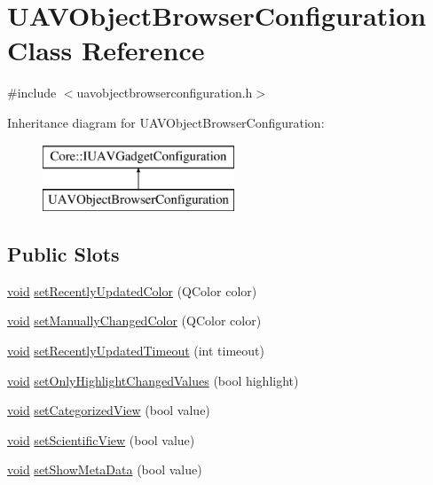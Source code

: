 \hypertarget{class_u_a_v_object_browser_configuration}{\section{\-U\-A\-V\-Object\-Browser\-Configuration \-Class \-Reference}
\label{class_u_a_v_object_browser_configuration}
}


{\ttfamily \#include $<$uavobjectbrowserconfiguration.\-h$>$}

\-Inheritance diagram for \-U\-A\-V\-Object\-Browser\-Configuration\-:\begin{figure}[H]
\begin{center}
\leavevmode
\includegraphics[height=2.000000cm]{class_u_a_v_object_browser_configuration}
\end{center}
\end{figure}
\subsection*{\-Public \-Slots}
\begin{DoxyCompactItemize}
\item 
\hyperlink{group___u_a_v_objects_plugin_ga444cf2ff3f0ecbe028adce838d373f5c}{void} \hyperlink{group___u_a_v_object_browser_plugin_gaf53d59e82beee15d1cafdfe22d9fcac6}{set\-Recently\-Updated\-Color} (\-Q\-Color color)
\item 
\hyperlink{group___u_a_v_objects_plugin_ga444cf2ff3f0ecbe028adce838d373f5c}{void} \hyperlink{group___u_a_v_object_browser_plugin_gab8f25b7b00cb2f219ac53627e4ae7fba}{set\-Manually\-Changed\-Color} (\-Q\-Color color)
\item 
\hyperlink{group___u_a_v_objects_plugin_ga444cf2ff3f0ecbe028adce838d373f5c}{void} \hyperlink{group___u_a_v_object_browser_plugin_ga315e76c383270fc3ab6ec717ca0dd0e3}{set\-Recently\-Updated\-Timeout} (int timeout)
\item 
\hyperlink{group___u_a_v_objects_plugin_ga444cf2ff3f0ecbe028adce838d373f5c}{void} \hyperlink{group___u_a_v_object_browser_plugin_gaf4d1a9bda21db2cc36ab4964ecb69fa4}{set\-Only\-Highlight\-Changed\-Values} (bool highlight)
\item 
\hyperlink{group___u_a_v_objects_plugin_ga444cf2ff3f0ecbe028adce838d373f5c}{void} \hyperlink{group___u_a_v_object_browser_plugin_ga733d1a12782c0f87157f99566bde9e70}{set\-Categorized\-View} (bool value)
\item 
\hyperlink{group___u_a_v_objects_plugin_ga444cf2ff3f0ecbe028adce838d373f5c}{void} \hyperlink{group___u_a_v_object_browser_plugin_gac72aa6686e16d9e653a7974c066cd345}{set\-Scientific\-View} (bool value)
\item 
\hyperlink{group___u_a_v_objects_plugin_ga444cf2ff3f0ecbe028adce838d373f5c}{void} \hyperlink{group___u_a_v_object_browser_plugin_ga4105ee0a19a4196780e26ed03880f150}{set\-Show\-Meta\-Data} (bool value)
\end{DoxyCompactItemize}
